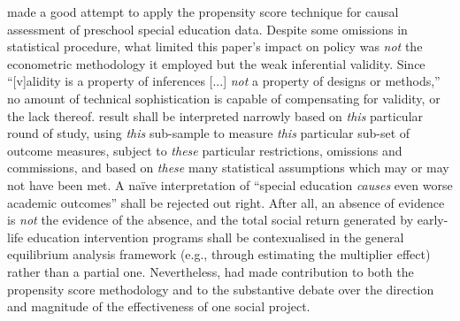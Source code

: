 \textcite{sullivan:2013} made a good attempt to apply the propensity score technique for causal assessment of preschool special education data. Despite some omissions in statistical procedure, what limited this paper's impact on policy was \emph{not} the econometric methodology it employed but the weak inferential validity. Since ``[v]alidity is a property of inferences [...] \emph{not} a property of designs or methods,'' \parencite[][p. 34, emphasis in original text]{shadish:2002} no amount of technical sophistication is capable of compensating for validity, or the lack thereof.  result shall be interpreted narrowly based on \emph{this} particular round of study, using \emph{this} sub-sample to measure \emph{this} particular sub-set of outcome measures, subject to \emph{these} particular restrictions, omissions and commissions, and based on \emph{these} many statistical assumptions which may or may not have been met. A na{\"i}ve interpretation of ``special education \emph{causes} even worse academic outcomes'' shall be rejected out right. After all, an absence of evidence is \emph{not} the evidence of the absence, and the total social return generated by early-life education intervention programs shall be contexualised in the general equilibrium analysis framework (e.g., through estimating the multiplier effect) rather than a partial one. Nevertheless, \textcite{sullivan:2013} had made contribution to both the propensity score methodology and to the substantive debate over the direction and magnitude of the effectiveness of one social project.